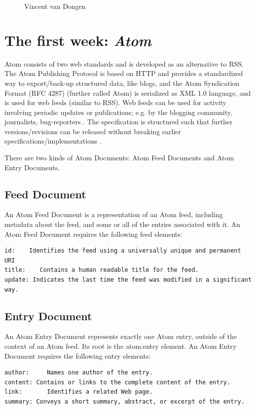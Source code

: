 \documentclass[11pt]{article}
\begin{document}
\begin{figure}[htbp]
\begin{minipage}[b]{0.25\linewidth}
    \caption{Vincent van Dongen}
  \end{minipage}
\end{figure}

\newpage
\section {The first week: \textit{Atom}}
Atom consists of two web standards and is developed as an alternative to RSS. The Atom Publishing Protocol is based on HTTP and provides a standardized way to export/back-up structured data, like blogs, and the Atom Syndication Format (RFC 4287) (further called Atom) is serialized as XML 1.0 language, and is used for web feeds (similar to RSS). Web feeds can be used for activity involving periodic updates or publications; e.g. by the blogging community, journalists, bug-reporters \cite{source1}. The specification is structured such that further versions/revisions can be released without breaking earlier specifications/implementations \cite{source1,source2}. 

There are two kinds of Atom Documents: Atom Feed Documents and Atom Entry Documents.

\subsection{Feed Document}
An Atom Feed Document is a representation of an Atom feed, including metadata about the feed, and some or all of the entries associated with it. \cite{source3} An Atom Feed Document requires the following feed elements:
\begin{lstlisting}
id:    Identifies the feed using a universally unique and permanent URI  
title:    Contains a human readable title for the feed.                 
update: Indicates the last time the feed was modified in a significant way.
\end{lstlisting}

\subsection{Entry Document}
An Atom Entry Document represents exactly one Atom entry, outside of the context of an Atom feed. Its root is the atom:entry element. An Atom Entry Document requires the following entry elements:
\begin{lstlisting}
author:     Names one author of the entry.
content: Contains or links to the complete content of the entry. 
link:       Identifies a related Web page.
summary: Conveys a short summary, abstract, or excerpt of the entry. 
\end{lstlisting}
\end{document}
